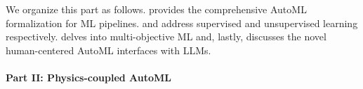 We organize this part as follows.
 provides the comprehensive AutoML formalization for ML pipelines.
 and  address supervised and unsupervised learning respectively.
 delves into multi-objective ML and, lastly,  discusses the novel human-centered AutoML interfaces with LLMs.

\paragraph{Part II: Physics-coupled AutoML}

